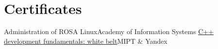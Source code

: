\section{Certificates}\label{sec:certificates}
\resumeSubHeadingListStart
\resumeSmallSubheading
{Administration of ROSA Linux}{Academy of Information Systems}
\resumeSmallSubheading
{\href{https://coursera.org/share/cc73c6a33e5a2d6124d6c2842b62343e}{C++ development fundamentals: white belt}}{MIPT \& Yandex}
\resumeSubHeadingListEnd